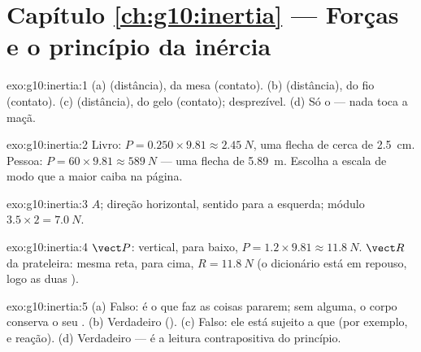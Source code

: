 \section*{Capítulo \ref{ch:g10:inertia} --- Forças e o princípio da inércia}

\begin{solution}{exo:g10:inertia:1}
(a)  (distância),  da mesa (contato). (b) 
(distância),  do fio (contato). (c)  (distância), 
do gelo (contato);  desprezível. (d) Só o  --- nada toca a
maçã.
\end{solution}

\begin{solution}{exo:g10:inertia:2}
Livro: $P = 0.250 \times 9.81 \approx \qty{2.45}{N}$, uma flecha de cerca
de \qty{2.5}{cm}. Pessoa: $P = 60 \times 9.81 \approx \qty{589}{N}$ ---
uma flecha de \qty{5.89}{m}. Escolha a escala de modo que a maior 
caiba na página.
\end{solution}

\begin{solution}{exo:g10:inertia:3}
 $A$; direção horizontal, sentido para a esquerda;
módulo $3.5 \times 2 = \qty{7.0}{N}$.
\end{solution}

\begin{solution}{exo:g10:inertia:4}
 $\vect P$: vertical, para baixo,
$P = 1.2 \times 9.81 \approx \qty{11.8}{N}$.  $\vect R$ da
prateleira: mesma reta, para cima, $R = \qty{11.8}{N}$ (o dicionário está
em repouso, logo as duas ).
\end{solution}

\begin{solution}{exo:g10:inertia:5}
(a) Falso: é o  que faz as coisas pararem; sem  alguma, o
corpo conserva o seu . (b) Verdadeiro
(). (c) Falso: ele está sujeito a  que
\emph{} (por exemplo,  e reação). (d) Verdadeiro --- é a
leitura contrapositiva do princípio.
\end{solution}

